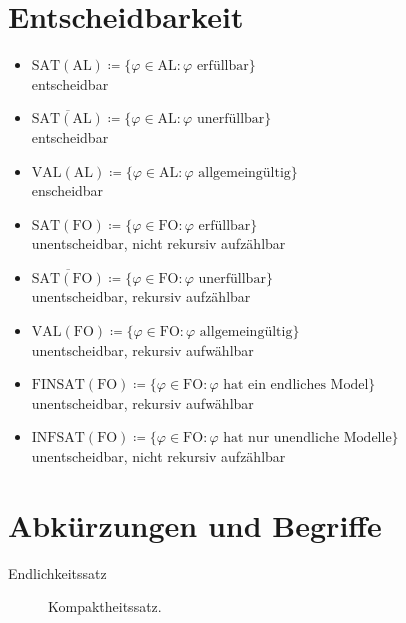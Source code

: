 \chapter{Entscheidbarkeit}
    \begin{itemize}
        \item $ \text{SAT}(\text{AL}) \coloneqq \{ \varphi \in \text{AL} : \varphi \text{ erfüllbar} \} $ \\ entscheidbar
        \item $ \overline{\text{SAT}(\text{AL})} \coloneqq \{ \varphi \in \text{AL} : \varphi \text{ unerfüllbar} \} $ \\ entscheidbar
        \item $ \text{VAL}(\text{AL}) \coloneqq \{ \varphi \in \text{AL} : \varphi \text{ allgemeingültig} \} $ \\ enscheidbar
        \item $ \text{SAT}(\text{FO}) \coloneqq \{ \varphi \in \text{FO} : \varphi \text{ erfüllbar} \} $ \\ unentscheidbar, nicht rekursiv aufzählbar
        \item $ \overline{\text{SAT}(\text{FO})} \coloneqq \{ \varphi \in \text{FO} : \varphi \text{ unerfüllbar} \} $ \\ unentscheidbar, rekursiv aufzählbar
        \item $ \text{VAL}(\text{FO}) \coloneqq \{ \varphi \in \text{FO} : \varphi \text{ allgemeingültig} \} $ \\ unentscheidbar, rekursiv aufwählbar
        \item $ \text{FINSAT}(\text{FO}) \coloneqq \{ \varphi \in \text{FO} : \varphi \text{ hat ein endliches Model} \} $ \\ unentscheidbar, rekursiv aufwählbar
        \item $ \text{INFSAT}(\text{FO}) \coloneqq \{ \varphi \in \text{FO} : \varphi \text{ hat nur unendliche Modelle} \} $ \\ unentscheidbar, nicht rekursiv aufzählbar
    \end{itemize}


\chapter{Abkürzungen und Begriffe}
    \begin{description}
        \item[Endlichkeitssatz] Kompaktheitssatz.
    \end{description}
